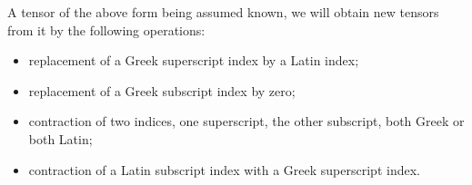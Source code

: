 A tensor of the above form being assumed known, we will obtain new tensors from it by the following operations:
\begin{itemize}
\item replacement of a Greek superscript index by a Latin index;
\item replacement of a Greek subscript index by zero;
\item 
contraction of two indices, one superscript, the other subscript, both Greek or both Latin;
\item 
contraction of a Latin subscript index with a Greek superscript index.

\end{itemize}
























































































